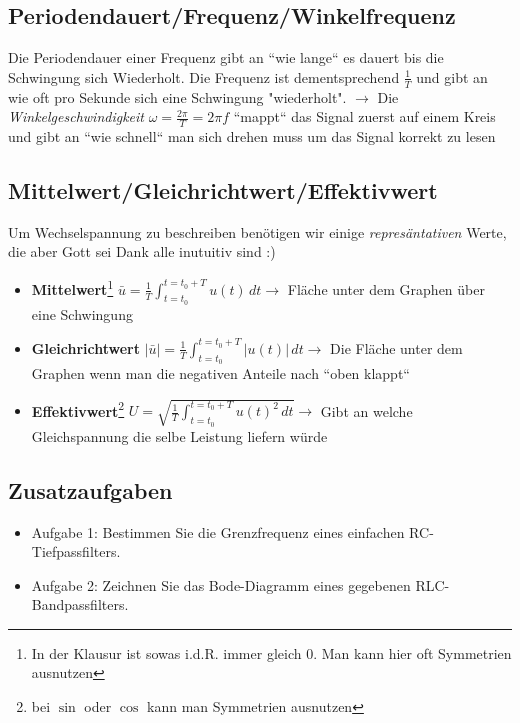 \documentclass[11pt,a4paper]{article}
\begin{document}
\subsection{Periodendauert/Frequenz/Winkelfrequenz}
Die Periodendauer einer Frequenz gibt an ``wie lange`` es dauert bis die Schwingung sich Wiederholt. Die Frequenz ist dementsprechend $\frac{1}{T}$ und gibt an wie oft pro Sekunde sich eine Schwingung "wiederholt". 
$\rightarrow$ Die \textit{Winkelgeschwindigkeit} $\omega=\frac{2\pi}{T} = 2\pi f$ ``mappt`` das Signal zuerst auf einem Kreis und gibt an ``wie schnell`` man sich drehen muss um das Signal korrekt zu lesen


\subsection{Mittelwert/Gleichrichtwert/Effektivwert}
Um Wechselspannung zu beschreiben benötigen wir einige \textit{represäntativen} Werte, die aber Gott sei Dank alle inutuitiv sind :)

\begin{itemize}
    \item\textbf{Mittelwert}\footnote{In der Klausur ist sowas i.d.R. immer gleich 0. Man kann hier oft Symmetrien ausnutzen} \quad $\bar{u} = \frac{1}{T} \int_{t=t_0}^{t=t_0+T} u(t) \, dt \rightarrow$ Fläche unter dem Graphen über eine Schwingung
    
    \item\textbf{Gleichrichtwert} \quad $|\bar{u}| = \frac{1}{T} \int_{t=t_0}^{t=t_0+T} |u(t)| \, dt\rightarrow$  Die Fläche unter dem Graphen wenn man die negativen Anteile nach ``oben klappt``
    
    \item\textbf{Effektivwert}\footnote{bei $\sin$ oder $\cos$ kann man Symmetrien ausnutzen} \quad $U = \sqrt{\frac{1}{T} \int_{t=t_0}^{t=t_0+T} u(t)^2 \, dt}\rightarrow$ Gibt an welche Gleichspannung die selbe Leistung liefern würde
\end{itemize}

\subsection{Zusatzaufgaben}
\begin{itemize}
    \item Aufgabe 1: Bestimmen Sie die Grenzfrequenz eines einfachen RC-Tiefpassfilters.
    \item Aufgabe 2: Zeichnen Sie das Bode-Diagramm eines gegebenen RLC-Bandpassfilters.
\end{itemize}
\end{document}
